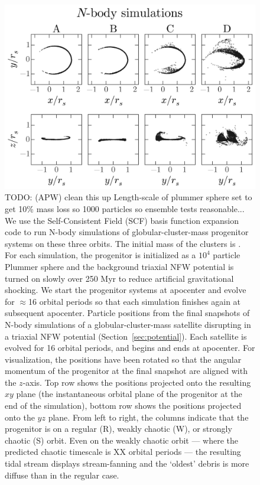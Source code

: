 \documentclass[letterpaper,12pt,preprint]{aastex}
\newcommand{\todo}[2]{{\color{red} TODO: (\MakeUppercase{#1}) #2}}
\begin{document}
\begin{figure}[p]
\begin{center}
\includegraphics[width=\textwidth]{figures/nbody.png}
\caption{ \todo{apw}{clean this up}
Length-scale of plummer sphere set to get 10\% mass loss so 1000 particles so ensemble tests reasonable... We use the Self-Consistent Field (SCF) basis function expansion code \citep{hernquist92} to run N-body simulations of globular-cluster-mass progenitor systems on these three orbits. The initial mass of the clusters is . For each simulation, the progenitor is initialized as a $10^4$ particle Plummer sphere and the background triaxial NFW potential is turned on slowly over 250 Myr to reduce artificial gravitational shocking. We start the progenitor systems at apocenter and evolve for $\approx$16 orbital periods so that each simulation finishes again at subsequent apocenter.  Particle positions from the final snapshots of N-body simulations of a globular-cluster-mass satellite disrupting in a triaxial NFW potential (Section~\ref{sec:potential}). Each satellite is evolved for 16 orbital periods, and begins and ends at apocenter. For visualization, the positions have been rotated so that the angular momentum of the progenitor at the final snapshot are aligned with the $z$-axis. Top row shows the positions projected onto the resulting $xy$ plane (the instantaneous orbital plane of the progenitor at the end of the simulation), bottom row shows the positions projected onto the $yz$ plane. From left to right, the columns indicate that the progenitor is on a regular (R), weakly chaotic (W), or strongly chaotic (S) orbit. Even on the weakly chaotic orbit --- where the predicted chaotic timescale is XX orbital periods --- the resulting tidal stream displays stream-fanning and the `oldest' debris is more diffuse than in the regular case.} 
\label{fig:nbodysims}
\end{center}
\end{figure}
\end{document}
